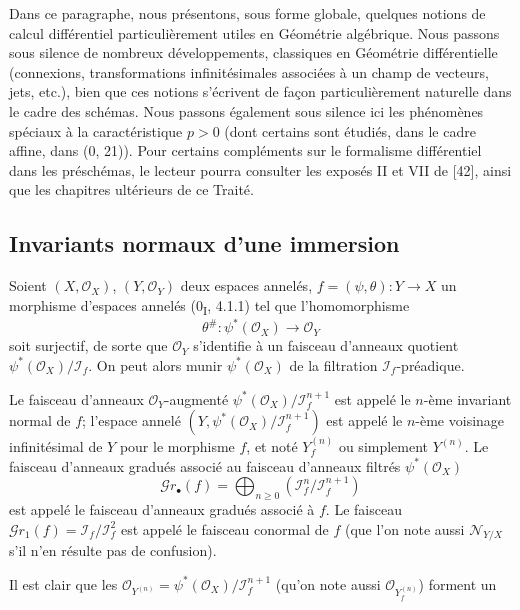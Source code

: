 Dans ce paragraphe, nous présentons, sous forme globale, quelques notions de
calcul différentiel particulièrement utiles en Géométrie algébrique. Nous passons sous
silence de nombreux développements, classiques en Géométrie différentielle (connexions,
transformations infinitésimales associées à un champ de vecteurs, jets, etc.), bien que ces
notions s'écrivent de façon particulièrement naturelle dans le cadre des schémas. Nous
passons également sous silence ici les phénomènes spéciaux à la caractéristique $p>0$
(dont certains sont étudiés, dans le cadre affine, dans (0, 21)). Pour certains compléments
sur le formalisme différentiel dans les préschémas, le lecteur pourra consulter les
exposés II et VII de [42], ainsi que les chapitres ultérieurs de ce Traité.

\subsection{Invariants normaux d'une immersion}

\begin{env}[16.1.1]
\label{IV.16.1.1}
Soient $(X,\mathcal{O}_X)$, $(Y,\mathcal{O}_Y)$ deux espaces annelés,
$f=(\psi,\theta):Y\to X$ un morphisme d'espaces annelés (0\textsubscript{I}, 4.1.1)
tel que l'homomorphisme
\[
  \theta^\#:\psi^*(\mathcal{O}_X)\longrightarrow\mathcal{O}_Y
\]
soit surjectif, de sorte que $\mathcal{O}_Y$ s'identifie à un faisceau d'anneaux quotient
$\psi^*(\mathcal{O}_X)/\mathscr{I}_f$. On peut alors munir
$\psi^*(\mathcal{O}_X)$ de la filtration $\mathscr{I}_f$-préadique.
\end{env}

\begin{definition}[16.1.2]
Le faisceau d'anneaux $\mathcal{O}_Y$-augmenté
$\psi^*(\mathcal{O}_X)/\mathscr{I}_f^{n+1}$ est appelé le $n$-ème invariant normal
de $f$; l'espace annelé
$(Y,\psi^*(\mathcal{O}_X)/\mathscr{I}_f^{n+1})$ est appelé le $n$-ème voisinage
infinitésimal de $Y$ pour le morphisme $f$, et noté $Y_f^{(n)}$ ou simplement
$Y^{(n)}$. Le faisceau d'anneaux gradués associé au faisceau d'anneaux filtrés
$\psi^*(\mathcal{O}_X)$
\[
  \mathscr{G}r_\bullet(f)=\bigoplus_{n\geq 0}
  (\mathscr{I}_f^n/\mathscr{I}_f^{n+1})
  \tag{16.1.2.1}
  \label{IV.16.1.2.1}
\]
est appelé le faisceau d'anneaux gradués associé à $f$. Le faisceau
$\mathscr{G}r_1(f)=\mathscr{I}_f/\mathscr{I}_f^2$ est appelé le faisceau conormal
de $f$ (que l'on note aussi $\mathscr{N}_{Y/X}$ s'il n'en résulte pas de confusion).
\end{definition}

Il est clair que les
$\mathcal{O}_{Y^{(n)}}=\psi^*(\mathcal{O}_X)/\mathscr{I}_f^{n+1}$
(qu'on note aussi $\mathcal{O}_{Y_f^{(n)}}$) forment un
